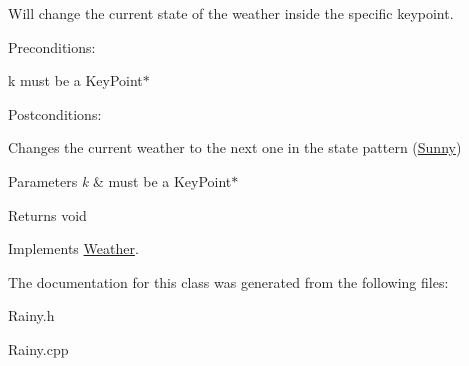 Will change the current state of the weather inside the specific keypoint. 

Preconditions\+:
\begin{DoxyItemize}
\item k must be a Key\+Point$\ast$
\end{DoxyItemize}

Postconditions\+:
\begin{DoxyItemize}
\item Changes the current weather to the next one in the state pattern (\hyperlink{classSunny}{Sunny})
\end{DoxyItemize}


\begin{DoxyParams}{Parameters}
{\em k} & must be a Key\+Point$\ast$ \\
\hline
\end{DoxyParams}
\begin{DoxyReturn}{Returns}
void 
\end{DoxyReturn}


Implements \hyperlink{classWeather}{Weather}.



The documentation for this class was generated from the following files\+:\begin{DoxyCompactItemize}
\item 
Rainy.\+h\item 
Rainy.\+cpp\end{DoxyCompactItemize}

